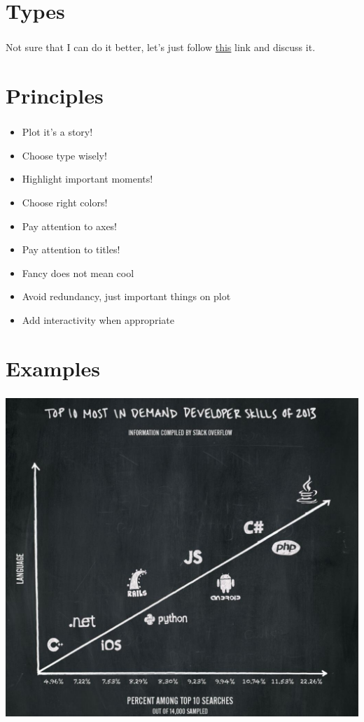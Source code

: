 \documentclass[t, 11pt]{beamer}
\begin{document}
\section{Types}
		\begin{frame} 
		\frametitle{\insertsection} 
	Not sure that I  can do it better, let's just follow \href{https://towardsdatascience.com/top-16-types-of-chart-in-data-visualization-196a76b54b62}{this} link and discuss it. 
	\end{frame}

\section{Principles}
\begin{frame} 
	\frametitle{\insertsection} 
			\begin{itemize}
	\item Plot it's a story! 
	\item Choose type wisely! 
	\item Highlight important moments!
	\item Choose right colors!
	\item Pay attention to axes! 
	\item Pay attention to titles!
	\item Fancy does not mean cool
	\item Avoid redundancy, just important things on plot
	\item Add interactivity when appropriate
\end{itemize}
\end{frame}	

\section{Examples}
\begin{frame} 
	\frametitle{\insertsection} 
	\begin{center}
	\includegraphics[scale=0.3]{bad_dev_plot}
\end{center}
\end{frame}
\end{document}
